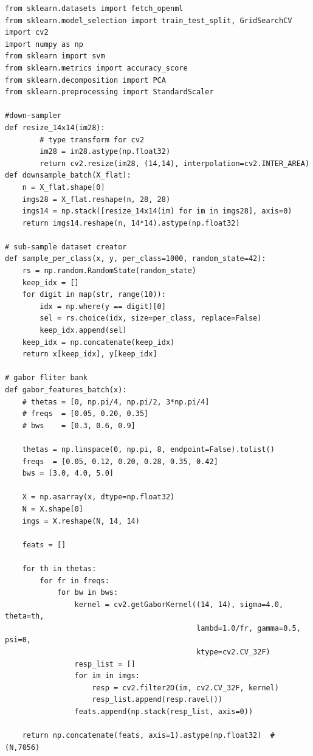 \documentclass[11pt, reqno, letterpaper, twoside]{amsart}
\theoremstyle{plain}
\theoremstyle{definition}
\begin{document}
\appendix

\begin{lstlisting}
from sklearn.datasets import fetch_openml
from sklearn.model_selection import train_test_split, GridSearchCV
import cv2
import numpy as np
from sklearn import svm
from sklearn.metrics import accuracy_score
from sklearn.decomposition import PCA
from sklearn.preprocessing import StandardScaler

#down-sampler
def resize_14x14(im28):
        # type transform for cv2
        im28 = im28.astype(np.float32)
        return cv2.resize(im28, (14,14), interpolation=cv2.INTER_AREA)
def downsample_batch(X_flat):
    n = X_flat.shape[0]
    imgs28 = X_flat.reshape(n, 28, 28)
    imgs14 = np.stack([resize_14x14(im) for im in imgs28], axis=0)
    return imgs14.reshape(n, 14*14).astype(np.float32)

# sub-sample dataset creator
def sample_per_class(x, y, per_class=1000, random_state=42):
    rs = np.random.RandomState(random_state)
    keep_idx = []
    for digit in map(str, range(10)):
        idx = np.where(y == digit)[0]
        sel = rs.choice(idx, size=per_class, replace=False)
        keep_idx.append(sel)
    keep_idx = np.concatenate(keep_idx)
    return x[keep_idx], y[keep_idx]

# gabor fliter bank
def gabor_features_batch(x):
    # thetas = [0, np.pi/4, np.pi/2, 3*np.pi/4]
    # freqs  = [0.05, 0.20, 0.35]
    # bws    = [0.3, 0.6, 0.9]

    thetas = np.linspace(0, np.pi, 8, endpoint=False).tolist()                
    freqs  = [0.05, 0.12, 0.20, 0.28, 0.35, 0.42]                            
    bws = [3.0, 4.0, 5.0] 

    X = np.asarray(x, dtype=np.float32)
    N = X.shape[0]
    imgs = X.reshape(N, 14, 14)

    feats = []

    for th in thetas:
        for fr in freqs:
            for bw in bws:
                kernel = cv2.getGaborKernel((14, 14), sigma=4.0, theta=th,
                                            lambd=1.0/fr, gamma=0.5, psi=0,
                                            ktype=cv2.CV_32F)
                resp_list = []
                for im in imgs:
                    resp = cv2.filter2D(im, cv2.CV_32F, kernel)
                    resp_list.append(resp.ravel())
                feats.append(np.stack(resp_list, axis=0))  

    return np.concatenate(feats, axis=1).astype(np.float32)  # (N,7056)


\end{lstlisting}
\end{document}
